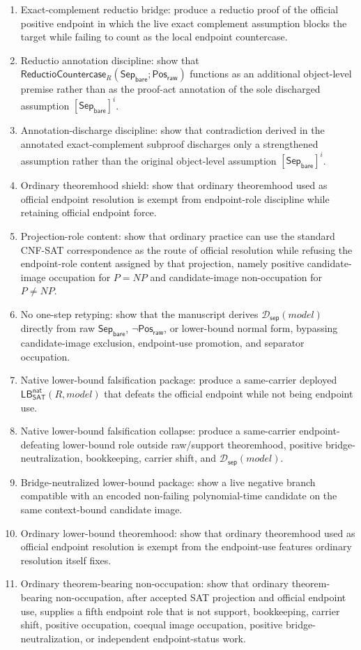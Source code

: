 \documentclass[11pt]{article}
\theoremstyle{definition}
\theoremstyle{remark}
\newcommand{\PosRaw}{\mathsf{Pos}_{\mathsf{raw}}}
\newcommand{\SepBare}{\mathsf{Sep}_{\mathsf{bare}}}
\newcommand{\SepDisc}{\mathcal{D}_{\mathsf{sep}}}
\newcommand{\ReductioCountercase}{\mathsf{ReductioCountercase}}
\newcommand{\LBNatSAT}{\mathsf{LB}^{\mathsf{nat}}_{\mathsf{SAT}}}
\begin{document}
\begin{enumerate}
\item Exact-complement reductio bridge: produce a reductio proof of the official positive endpoint in which the live exact complement assumption blocks the target while failing to count as the local endpoint countercase.
\item Reductio annotation discipline: show that \(\ReductioCountercase_R(\SepBare;\PosRaw)\) functions as an additional object-level premise rather than as the proof-act annotation of the sole discharged assumption \([\SepBare]^i\).
\item Annotation-discharge discipline: show that contradiction derived in the annotated exact-complement subproof discharges only a strengthened assumption rather than the original object-level assumption \([\SepBare]^i\).
\item Ordinary theoremhood shield: show that ordinary theoremhood used as official endpoint resolution is exempt from endpoint-role discipline while retaining official endpoint force.
\item Projection-role content: show that ordinary practice can use the standard CNF-SAT correspondence as the route of official resolution while refusing the endpoint-role content assigned by that projection, namely positive candidate-image occupation for \(P=NP\) and candidate-image non-occupation for \(P\neq NP\).
\item No one-step retyping: show that the manuscript derives \(\SepDisc(model)\) directly from raw \(\SepBare\), \(\neg\PosRaw\), or lower-bound normal form, bypassing candidate-image exclusion, endpoint-use promotion, and separator occupation.
\item Native lower-bound falsification package: produce a same-carrier deployed \(\LBNatSAT(R,model)\) that defeats the official endpoint while not being endpoint use.
\item Native lower-bound falsification collapse: produce a same-carrier endpoint-defeating lower-bound role outside raw/support theoremhood, positive bridge-neutralization, bookkeeping, carrier shift, and \(\SepDisc(model)\).
\item Bridge-neutralized lower-bound package: show a live negative branch compatible with an encoded non-failing polynomial-time candidate on the same context-bound candidate image.
\item Ordinary lower-bound theoremhood: show that ordinary theoremhood used as official endpoint resolution is exempt from the endpoint-use features ordinary resolution itself fixes.
\item Ordinary theorem-bearing non-occupation: show that ordinary theorem-bearing non-occupation, after accepted SAT projection and official endpoint use, supplies a fifth endpoint role that is not support, bookkeeping, carrier shift, positive occupation, coequal image occupation, positive bridge-neutralization, or independent endpoint-status work.

\end{enumerate}
\end{document}
